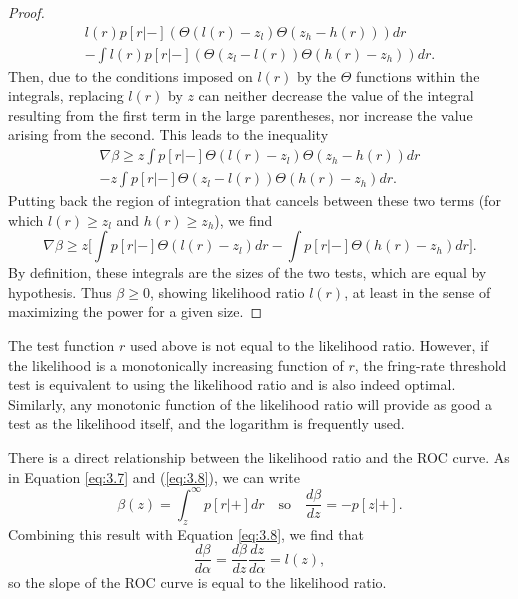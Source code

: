 \begin{lem}
\begin{proof}
\begin{equation}
\begin{split}
{    l(r)p[r|-]\left(\Theta(l(r)-z_l)\Theta(z_{h}-h(r))\right)dr}\\
    -\int {l(r)p[r|-]\left(\Theta(z_{l}-l(r))\Theta(h(r)-z_h) \right)dr}.
  \end{split}
  \end{equation}
  Then, due to the conditions imposed on $l(r)$ by the $\Theta$ functions within the
integrals, replacing $l(r)$ by $z$ can neither decrease the value of the integral
resulting from the first term in the large parentheses, nor increase the value
arising from the second. This leads to the inequality
\begin{equation}
  \label{eq:3.65}
  \begin{split}
    \nabla\beta\geq z\int {p[r|-]
    \Theta(l(r)-z_l)\Theta(z_{h}-h(r))dr}\\
    -z\int {p[r|-]\Theta(z_{l}-l(r))\Theta(h(r)-z_h)dr}.
  \end{split}
  \end{equation}
  Putting back the region of integration that cancels between these two
  terms (for which $l(r)\geq z_{l}$ and $h(r)\geq z_{h}$), we find
  \begin{equation}
    \label{eq:3.66}
    \nabla\beta\geq z\Big[\int {p[r|-]\Theta(l(r)-z_l)dr}-\int {p[r|-]\Theta(h(r)-z_h)dr}\Big].
  \end{equation}
  By definition, these integrals are the sizes of the two tests, which are equal
by hypothesis. Thus $\beta\geq 0$, showing
likelihood ratio $l(r)$, at least in the sense of maximizing the power for a
given size.
\end{proof}\qedhere
\end{lem}

\begin{rem}
  The test function $r$ used above is
not equal to the likelihood ratio. However, if the likelihood is a
monotonically increasing function of $r$, the fring-rate threshold test
is equivalent to using the likelihood ratio and is also indeed
optimal. Similarly, any monotonic function of the likelihood ratio will
provide as good a test as the likelihood itself, and the logarithm is frequently used.
\end{rem}



\begin{prop}
   There is a direct relationship between the likelihood ratio and the ROC
  curve. As in Equation \ref{eq:3.7} and (\ref{eq:3.8}), we can
  write
  \begin{equation}
  \label{eq:3.13}
  \beta(z)=\int_z^{\infty}p[r|+]dr \quad\text{so} \quad \frac{d\beta}{dz}=-p[z|+].
\end{equation}
Combining this result with Equation \ref{eq:3.8}, we find that
\begin{equation}
  \label{eq:3.14}
  \frac{d\beta}{d\alpha}=\frac{d\beta}{dz}\frac{dz}{d\alpha}=l(z),
\end{equation}
so the slope of the ROC curve is equal to the likelihood ratio.
\end{prop}

